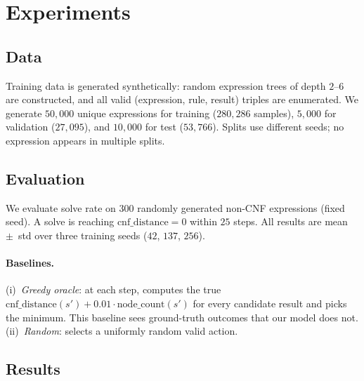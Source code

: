 \documentclass{article}
\begin{document}
\section{Experiments}

\subsection{Data}

Training data is generated synthetically: random expression trees of depth
$2$--$6$ are constructed, and all valid (expression, rule, result) triples
are enumerated. We generate $50{,}000$ unique expressions for training
($280{,}286$ samples), $5{,}000$ for validation ($27{,}095$), and
$10{,}000$ for test ($53{,}766$). Splits use different seeds; no expression
appears in multiple splits.

\subsection{Evaluation}

We evaluate solve rate on $300$ randomly generated non-CNF expressions
(fixed seed). A solve is reaching $\text{cnf\_distance} = 0$ within $25$
steps. All results are mean~$\pm$~std over three training seeds ($42$,
$137$, $256$).

\paragraph{Baselines.}
(i)~\emph{Greedy oracle}: at each step, computes the true
$\text{cnf\_distance}(s') + 0.01 \cdot \text{node\_count}(s')$ for every
candidate result and picks the minimum. This baseline sees ground-truth
outcomes that our model does not.
(ii)~\emph{Random}: selects a uniformly random valid action.

\subsection{Results}
\end{document}

